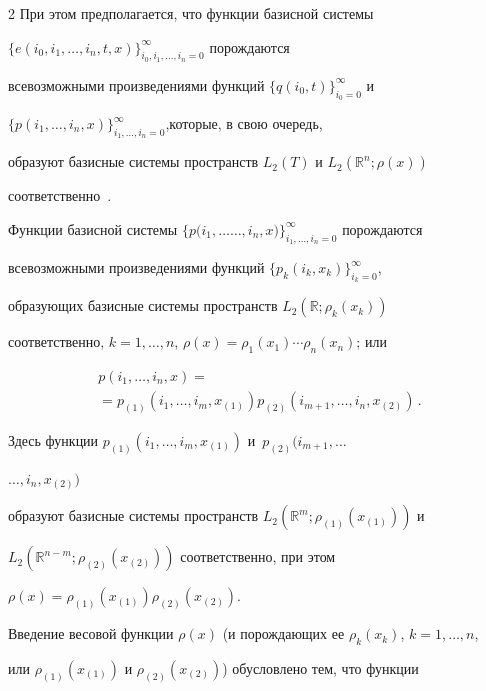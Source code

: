 \begin{multicols}{2}
При этом предполагается, что функции базисной сис\-те\-мы 


${\{e(i_0,i_1,\dots,i_n,t,x)\}_{i_0,i_1,\dots,i_n = 0}^\infty}$ порождаются 


всевозможными произведениями функций ${\{q(i_0,t)\}_{i_0 = 0}^\infty}$ и 


${\{p(i_1,\dots,i_n,x)\}_{i_1,\dots,i_n = 0}^\infty}$,\linebreak которые, в свою очередь, 


образуют базисные сис\-те\-мы про\-странств $L_2(T)$ и ${L_2(\mathbb{R}^n; \rho(x))}$ 


соответственно~\cite{Pug}.





Функции базисной сис\-те\-мы $\{p(i_1,\dots$\linebreak $\dots, i_n,x)\}_{i_1,\dots,i_n = 0}^\infty$ порождаются 


всевозможными произведениями функций ${\{p_k(i_k,x_k)\}_{i_k = 0}^\infty}$, 


образующих базисные сис\-те\-мы пространств ${L_2(\mathbb{R}; \rho_k(x_k))}$ 


соответственно, ${k = 1,\dots,n}$, ${\rho(x) = \rho_1(x_1) \cdots \rho_n(x_n)}$; или


\begin{multline*}


  p(i_1,\dots,i_n,x) ={}\\


  {}= p_{(1)}(i_1,\dots,i_m,x_{(1)}) p_{(2)}(i_{m+1},\dots,i_n,x_{(2)})\,.


\end{multline*}


Здесь функции ${p_{(1)}(i_1,\dots,i_m,x_{(1)})}$ и~$p_{(2)}(i_{m+1},\dots$\linebreak 


$\dots,i_n,x_{(2)})$ 


образуют базисные сис\-те\-мы пространств ${L_2(\mathbb{R}^m; \rho_{(1)}(x_{(1)}))}$ и 


${L_2(\mathbb{R}^{n-m}; \rho_{(2)}(x_{(2)}))}$ соответственно, при этом 


${\rho(x) = \rho_{(1)}(x_{(1)})  \rho_{(2)}(x_{(2)})}$.





Введение весовой функции $\rho(x)$ (и порождающих ее $\rho_k(x_k)$, ${k = 1,\dots,n}$, 


или $\rho_{(1)}(x_{(1)})$ и $\rho_{(2)}(x_{(2)})$) обусловлено тем, что функции 



\end{multicols}
